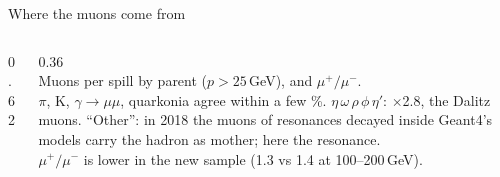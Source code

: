 \documentclass[aspectratio=169,10pt]{beamer}
\begin{document}
\begin{frame}{Where the muons come from}
  \begin{columns}[c]
    \begin{column}{0.62\textwidth}
      \\[0.5mm]
    \end{column}
    \begin{column}{0.36\textwidth}
      \\[1mm]
      \scriptsize
      Muons per spill by parent ($p>25$\,GeV), and $\mu^+/\mu^-$.\\[1mm]
      $\pi$, K, $\gamma\to\mu\mu$, quarkonia agree within a few \%. $\eta\,\omega\,\rho\,\phi\,\eta'$: $\times$2.8, the Dalitz muons. ``Other'': in 2018 the muons of resonances decayed inside Geant4's models carry the hadron as mother; here the resonance.\\[1mm]
      $\mu^+/\mu^-$ is lower in the new sample (1.3 vs 1.4 at 100--200\,GeV).
    \end{column}
  \end{columns}
\end{frame}
\end{document}
